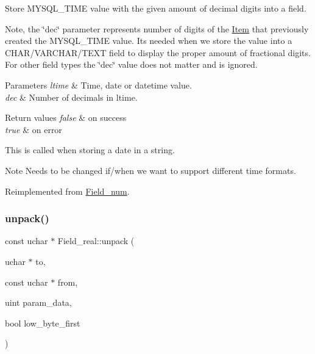 Store M\+Y\+S\+Q\+L\+\_\+\+T\+I\+ME value with the given amount of decimal digits into a field.

Note, the \char`\"{}dec\char`\"{} parameter represents number of digits of the \mbox{\hyperlink{classItem}{Item}} that previously created the M\+Y\+S\+Q\+L\+\_\+\+T\+I\+ME value. It\textquotesingle{}s needed when we store the value into a C\+H\+A\+R/\+V\+A\+R\+C\+H\+A\+R/\+T\+E\+XT field to display the proper amount of fractional digits. For other field types the \char`\"{}dec\char`\"{} value does not matter and is ignored.


\begin{DoxyParams}{Parameters}
{\em ltime} & Time, date or datetime value. \\
\hline
{\em dec} & Number of decimals in ltime. \\
\hline
\end{DoxyParams}

\begin{DoxyRetVals}{Return values}
{\em false} & on success \\
\hline
{\em true} & on error\\
\hline
\end{DoxyRetVals}
This is called when storing a date in a string.

\begin{DoxyNote}{Note}
Needs to be changed if/when we want to support different time formats. 
\end{DoxyNote}


Reimplemented from \mbox{\hyperlink{classField__num_ab573b6e30982c3d517794503f14560de}{Field\+\_\+num}}.

\mbox{\label{classField__real_aab922b4da48c1fd508344b1f627e0e0e}} 
\subsubsection{\texorpdfstring{unpack()}{unpack()}}
{\footnotesize\ttfamily const uchar $\ast$ Field\+\_\+real\+::unpack (\begin{DoxyParamCaption}\item[{uchar $\ast$}]{to,  }\item[{const uchar $\ast$}]{from,  }\item[{uint}]{param\+\_\+data,  }\item[{bool}]{low\+\_\+byte\+\_\+first }\end{DoxyParamCaption})\hspace{0.3cm}{\ttfamily [virtual]}}


